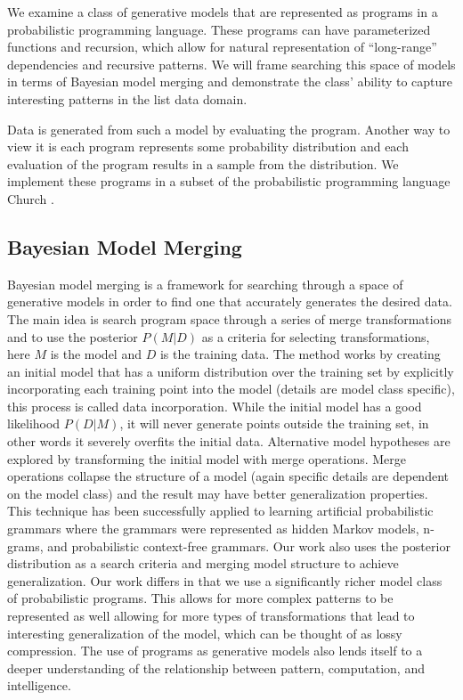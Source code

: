 \documentclass[a4paper,10pt]{article}
\begin{document}
We examine a class of generative models that are represented as programs in a probabilistic programming language.  These programs can have parameterized functions and recursion, which allow for natural representation of ``long-range'' dependencies and recursive patterns.  We will frame searching this space of models in terms of Bayesian model merging \cite{Stolcke:1994:IPG:645515.658235} and demonstrate the class' ability to capture interesting patterns in the list data domain.

Data is generated from such a model by evaluating the program.  Another way to view it is each program represents some probability distribution and each 
evaluation of the program results in a sample from the distribution. We implement these programs in a subset of the probabilistic programming language Church \cite{N.D.Goodman:2008:f2a0d}.  


\subsection{Bayesian Model Merging}
Bayesian model merging is a framework for searching through a space of generative models in order to find one that accurately generates the desired data.  The main idea is search program space through a series of merge transformations and to use the posterior $P(M|D)$ as a criteria for selecting transformations, here $M$ is the model and $D$ is the training data.  The method works by creating an initial model that has a uniform distribution over the training set by explicitly incorporating each training point into the model (details are model class specific), this process is called data incorporation.  While the initial model has a good likelihood $P(D|M)$, it will never generate points outside the training set, in other words it severely overfits the initial data.  Alternative model hypotheses are explored by transforming the initial model with merge operations.  Merge operations collapse the structure of a model (again specific details are dependent on the model class) and the result may have better generalization properties.  This technique has been successfully applied to learning artificial probabilistic grammars where the grammars were represented as hidden Markov models, n-grams, and probabilistic context-free grammars.  Our work also uses the posterior distribution as a search criteria and merging model structure to achieve generalization.  Our work differs in that we use a significantly richer model class of probabilistic programs.  This allows for more complex patterns to be represented as well allowing for more types of transformations that lead to interesting generalization of the model, which can be thought of as lossy compression.   The use of programs as generative models also lends itself to a deeper understanding of the relationship between pattern, computation, and intelligence.
\end{document}

